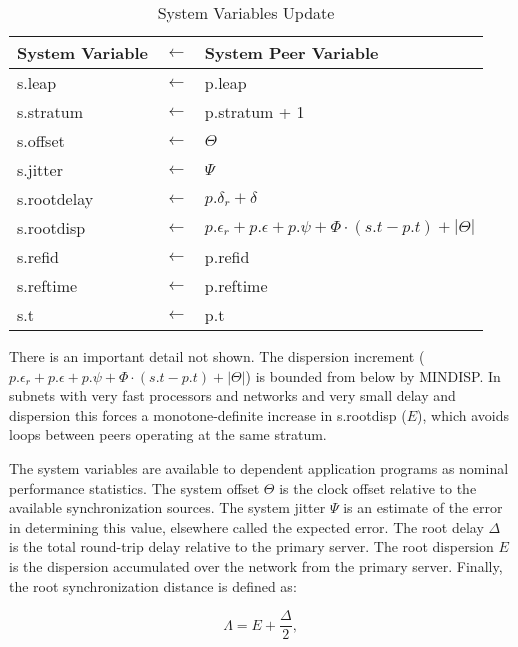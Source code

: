 \begin{table}[htb]
  \center
  \begin{tabular}{| l c l |}
    \hline
    System Variable & $ \leftarrow $ & System Peer Variable \\
    \hline
    \hline
    s.leap      & $ \leftarrow $ & p.leap                    \\
    s.stratum   & $ \leftarrow $ & p.stratum + 1             \\
    s.offset    & $ \leftarrow $ & $ \Theta $                     \\
    s.jitter    & $ \leftarrow $ & $ \Psi $                       \\
    s.rootdelay & $ \leftarrow $ & $ p.\delta_r + \delta $         \\
    s.rootdisp  & $ \leftarrow $ & $ p.\epsilon_r + p.\epsilon + p.\psi + \Phi \cdot (s.t - p.t) + |\Theta| $ \\
    s.refid     & $ \leftarrow $ & p.refid                   \\
    s.reftime   & $ \leftarrow $ & p.reftime                 \\
    s.t         & $ \leftarrow $ & p.t                       \\
    \hline
  \end{tabular}
  \caption{System Variables Update}
  \label{system_variables_update}
\end{table}

There is an important detail not shown. The dispersion increment
($ p.\epsilon_r + p.\epsilon + p.\psi + \Phi \cdot (s.t - p.t) + |\Theta| $) is bounded from
below by MINDISP. In subnets with very fast processors and networks
and very small delay and dispersion this forces a monotone-definite
increase in s.rootdisp ($ E $), which avoids loops between peers
operating at the same stratum.

The system variables are available to dependent application programs
as nominal performance statistics. The system offset $ \Theta $ is the
clock offset relative to the available synchronization sources. The
system jitter $ \Psi $ is an estimate of the error in determining this
value, elsewhere called the expected error. The root delay $ \Delta $ is
the total round-trip delay relative to the primary server. The root
dispersion $ E $ is the dispersion accumulated over the network
from the primary server. Finally, the root synchronization distance
is defined as:

$$
\Lambda = E + \frac{\Delta}{2},
$$

